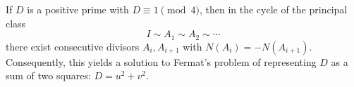If $D$ is a positive prime with $D \equiv 1 \pmod{4}$, then in the cycle of the principal class
$$I \sim A_1 \sim A_2 \sim \cdots$$
there exist consecutive divisors $A_i, A_{i+1}$ with $N(A_i) = -N(A_{i+1})$. Consequently, this yields a solution to Fermat's problem of representing $D$ as a sum of two squares: $D = u^2 + v^2$.
